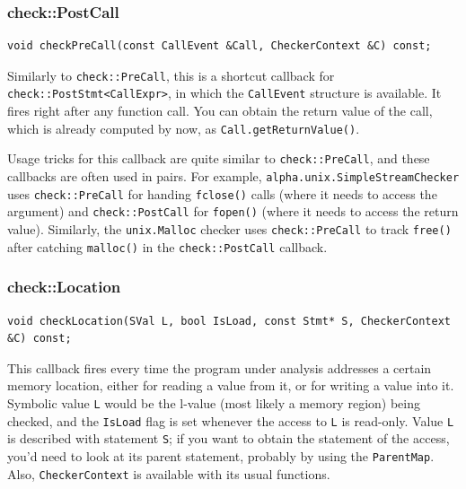 \documentclass[a4paper,12pt]{article}
\newenvironment{nobr}{\begin{minipage}{\textwidth}\setlength\parskip{1em}
}{\end{minipage}\ignorespacesafterend}
\begin{document}
\begin{nobr}
\subsubsection{check::PostCall}

\begin{lstlisting}[style=cplusplus,numbers=none]
void checkPreCall(const CallEvent &Call, CheckerContext &C) const;
\end{lstlisting}

Similarly to \lstinline|check::PreCall|, this is a shortcut callback for \lstinline|check::PostStmt<CallExpr>|, in which the \lstinline|CallEvent| structure is available. It fires right after any function call. You can obtain the return value of the call, which is already computed by now, as \lstinline|Call.getReturnValue()|.
\end{nobr}

Usage tricks for this callback are quite similar to \lstinline|check::PreCall|, and these callbacks are often used in pairs. For example, \lstinline|alpha.unix.SimpleStreamChecker| uses \lstinline|check::PreCall| for handing \lstinline|fclose()| calls (where it needs to access the argument) and \lstinline|check::PostCall| for \lstinline|fopen()| (where it needs to access the return value). Similarly, the \lstinline|unix.Malloc| checker uses \lstinline|check::PreCall| to track \lstinline|free()| after catching \lstinline|malloc()| in the \lstinline|check::PostCall| callback.

\begin{nobr}
\subsubsection{check::Location}

\begin{lstlisting}[style=cplusplus,numbers=none]
void checkLocation(SVal L, bool IsLoad, const Stmt* S, CheckerContext &C) const;
\end{lstlisting}

This callback fires every time the program under analysis addresses a certain memory location, either for reading a value from it, or for writing a value into it. Symbolic value \lstinline|L| would be the l-value (most likely a memory region) being checked, and the \lstinline|IsLoad| flag is set whenever the access to \lstinline|L| is read-only. Value \lstinline|L| is described with statement \lstinline|S|; if you want to obtain the statement of the access, you'd need to look at its parent statement, probably by using the \lstinline|ParentMap|. Also, \lstinline|CheckerContext| is available with its usual functions.
\end{nobr}
\end{document}
